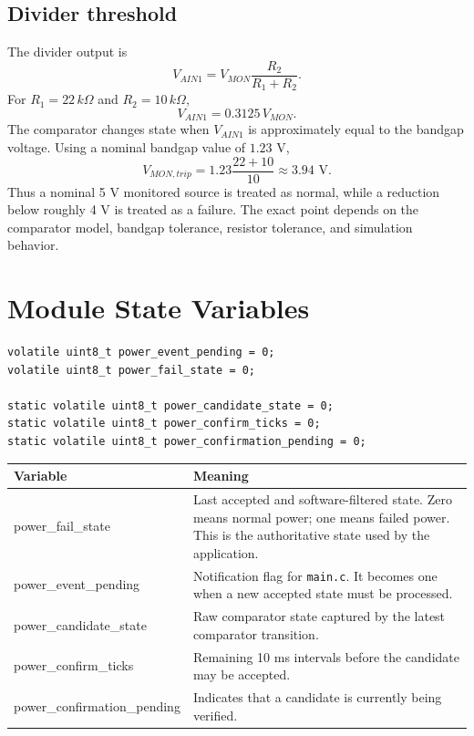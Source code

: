 \documentclass[11pt,a4paper]{article}
\begin{document}
\subsection{Divider threshold}
The divider output is
\[
V_{AIN1}=V_{MON}\frac{R_2}{R_1+R_2}.
\]
For $R_1=22\,k\Omega$ and $R_2=10\,k\Omega$,
\[
V_{AIN1}=0.3125\,V_{MON}.
\]
The comparator changes state when $V_{AIN1}$ is approximately equal to the bandgap voltage. Using a nominal bandgap value of $1.23$ V,
\[
V_{MON,trip}=1.23\frac{22+10}{10}\approx3.94\text{ V}.
\]
Thus a nominal 5 V monitored source is treated as normal, while a reduction below roughly 4 V is treated as a failure. The exact point depends on the comparator model, bandgap tolerance, resistor tolerance, and simulation behavior.

\section{Module State Variables}

\begin{lstlisting}[style=cstyle,caption={Power-state variables.}]
volatile uint8_t power_event_pending = 0;
volatile uint8_t power_fail_state = 0;

static volatile uint8_t power_candidate_state = 0;
static volatile uint8_t power_confirm_ticks = 0;
static volatile uint8_t power_confirmation_pending = 0;
\end{lstlisting}

\begin{longtable}{>{\ttfamily}p{}p{}}
\toprule
\normalfont Variable & Meaning \\
\midrule
\endhead
power\_fail\_state & Last accepted and software-filtered state. Zero means normal power; one means failed power. This is the authoritative state used by the application. \\
power\_event\_pending & Notification flag for \texttt{main.c}. It becomes one when a new accepted state must be processed. \\
power\_candidate\_state & Raw comparator state captured by the latest comparator transition. \\
power\_confirm\_ticks & Remaining 10 ms intervals before the candidate may be accepted. \\
power\_confirmation\_pending & Indicates that a candidate is currently being verified. \\
\bottomrule
\end{longtable}
\end{document}

